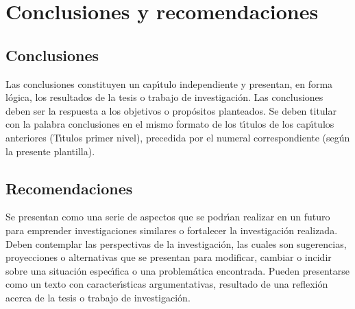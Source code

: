 \chapter{Conclusiones y recomendaciones}\label{cap:Conclusiones}
\section{Conclusiones}
Las conclusiones constituyen un cap\'{\i}tulo independiente y presentan, en forma l\'{o}gica, los resultados de la tesis  o trabajo de investigaci\'{o}n. Las conclusiones deben ser la respuesta a los objetivos o prop\'{o}sitos planteados. Se deben titular con la palabra conclusiones en el mismo formato de los t\'{\i}tulos de los cap\'{\i}tulos anteriores (T\'{\i}tulos primer nivel), precedida por el numeral correspondiente (seg\'{u}n la presente plantilla).\\

\section{Recomendaciones}
Se presentan como una serie de aspectos que se podr\'{\i}an realizar en un futuro para emprender investigaciones similares o fortalecer la investigaci\'{o}n realizada. Deben contemplar las perspectivas de la investigaci\'{o}n, las cuales son sugerencias, proyecciones o alternativas que se presentan para modificar, cambiar o incidir sobre una situaci\'{o}n espec\'{\i}fica o una problem\'{a}tica encontrada. Pueden presentarse como un texto con caracter\'{\i}sticas argumentativas, resultado de una reflexi\'{o}n acerca de la tesis o trabajo de investigaci\'{o}n.\\